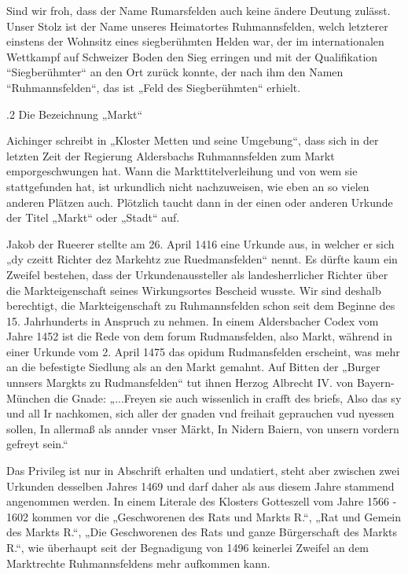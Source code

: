 \documentclass[12pt,a4paper]{book}
\begin{document}
Sind wir froh, dass der Name Rumarsfelden auch keine ändere Deutung zulässt.
Unser Stolz ist der Name unseres Heimatortes Ruhmannsfelden, welch letzterer
einstens der Wohnsitz eines siegberühmten Helden war, der im internationalen
Wettkampf auf Schweizer Boden den Sieg erringen und mit der Qualifikation
“Siegberühmter“ an den Ort zurück konnte, der nach ihm den Namen
“Ruhmannsfelden“, das ist „Feld des Siegberühmten“ erhielt.



.2 Die Bezeichnung „Markt“

Aichinger schreibt in „Kloster Metten und seine Umgebung“, dass sich in der
letzten Zeit der Regierung Aldersbachs Ruhmannsfelden zum Markt emporgeschwungen
hat. Wann die Markttitelverleihung und von wem sie stattgefunden hat, ist
urkundlich nicht nachzuweisen, wie eben an so vielen anderen Plätzen auch.
Plötzlich taucht dann in der einen oder anderen Urkunde der Titel „Markt“ oder
„Stadt“ auf.

Jakob der Rueerer stellte am 26. April 1416 eine Urkunde aus, in welcher er sich
„dy czeitt Richter dez Markehtz zue Ruedmansfelden“ nennt. Es dürfte kaum ein
Zweifel bestehen, dass der Urkundenaussteller als landesherrlicher Richter über
die Markteigenschaft seines Wirkungsortes Bescheid wusste. Wir sind deshalb
berechtigt, die Markteigenschaft zu Ruhmannsfelden schon seit dem Beginne des
15. Jahrhunderts in Anspruch zu nehmen. In einem Aldersbacher Codex vom Jahre
1452 ist die Rede von dem forum Rudmansfelden, also Markt, während in einer
Urkunde vom 2. April 1475 das opidum Rudmansfelden erscheint, was mehr an die
befestigte Siedlung als an den Markt gemahnt. Auf Bitten der „Burger unnsers
Margkts zu Rudmansfelden“ tut ihnen Herzog Albrecht IV. von Bayern-München die
Gnade: „...Freyen sie auch wissenlich in crafft des briefs, Also das sy und all
Ir nachkomen, sich aller der gnaden vnd freihait geprauchen vud nyessen sollen,
In allermaß als annder vnser Märkt, In Nidern Baiern, von unsern vordern gefreyt
sein.“

Das Privileg ist nur in Abschrift erhalten und undatiert, steht aber zwischen
zwei Urkunden desselben Jahres 1469 und darf daher als aus diesem Jahre stammend
angenommen werden. In einem Literale des Klosters Gotteszell vom Jahre 1566 -
1602 kommen vor die „Geschworenen des Rats und Markts R.“, „Rat und Gemein des
Markts R.“, „Die Geschworenen des Rats und ganze Bürgerschaft des Markts R.“,
wie überhaupt seit der Begnadigung von 1496 keinerlei Zweifel an dem Marktrechte
Ruhmannsfeldens mehr aufkommen kann.
\end{document}
